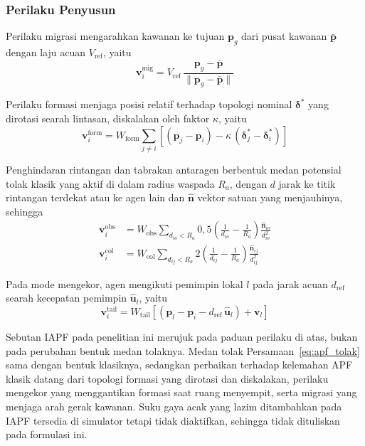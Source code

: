 \documentclass[12pt,a4paper]{report}
\begin{document}
\subsubsection{Perilaku Penyusun}

Perilaku migrasi mengarahkan kawanan ke tujuan $\mathbf{p}_g$ dari pusat kawanan $\bar{\mathbf{p}}$ dengan laju acuan $V_{\mathrm{ref}}$, yaitu
\begin{equation}
    \mathbf{v}_i^{\mathrm{mig}} = V_{\mathrm{ref}}\,\frac{\mathbf{p}_g - \bar{\mathbf{p}}}{\lVert \mathbf{p}_g - \bar{\mathbf{p}} \rVert}
\end{equation}

Perilaku formasi menjaga posisi relatif terhadap topologi nominal $\boldsymbol{\delta}^*$ yang dirotasi searah lintasan, diskalakan oleh faktor $\kappa$, yaitu
\begin{equation}
    \mathbf{v}_i^{\mathrm{form}} = W_{\mathrm{form}} \sum_{j \neq i} \left[ (\mathbf{p}_j - \mathbf{p}_i) - \kappa\,(\boldsymbol{\delta}_j^* - \boldsymbol{\delta}_i^*) \right]
    \label{eq:erc_formasi}
\end{equation}

Penghindaran rintangan dan tabrakan antaragen berbentuk medan potensial tolak klasik yang aktif di dalam radius waspada $R_a$, dengan $d$ jarak ke titik rintangan terdekat atau ke agen lain dan $\hat{\mathbf{n}}$ vektor satuan yang menjauhinya, sehingga
\begin{align}
    \mathbf{v}_i^{\mathrm{obs}} &= W_{\mathrm{obs}} \sum_{d_{io} < R_a} 0{,}5 \left( \frac{1}{d_{io}} - \frac{1}{R_a} \right) \frac{\hat{\mathbf{n}}_{io}}{d_{io}^2} \\
    \mathbf{v}_i^{\mathrm{col}} &= W_{\mathrm{col}} \sum_{d_{ij} < R_a} 2 \left( \frac{1}{d_{ij}} - \frac{1}{R_a} \right) \frac{\hat{\mathbf{n}}_{ij}}{d_{ij}^2}
    \label{eq:apf_tolak}
\end{align}

Pada mode mengekor, agen mengikuti pemimpin lokal $l$ pada jarak acuan $d_{\mathrm{ref}}$ searah kecepatan pemimpin $\hat{\mathbf{u}}_l$, yaitu
\begin{equation}
    \mathbf{v}_i^{\mathrm{tail}} = W_{\mathrm{tail}} \left[ (\mathbf{p}_l - \mathbf{p}_i - d_{\mathrm{ref}}\,\hat{\mathbf{u}}_l) + \mathbf{v}_l \right]
\end{equation}

Sebutan IAPF pada penelitian ini merujuk pada paduan perilaku di atas, bukan pada perubahan bentuk medan tolaknya. Medan tolak Persamaan~\ref{eq:apf_tolak} sama dengan bentuk klasiknya, sedangkan perbaikan terhadap kelemahan APF klasik datang dari topologi formasi yang dirotasi dan diskalakan, perilaku mengekor yang menggantikan formasi saat ruang menyempit, serta migrasi yang menjaga arah gerak kawanan. Suku gaya acak yang lazim ditambahkan pada IAPF \cite{wangUAVFormationObstacle2021} tersedia di simulator tetapi tidak diaktifkan, sehingga tidak dituliskan pada formulasi ini.
\end{document}
